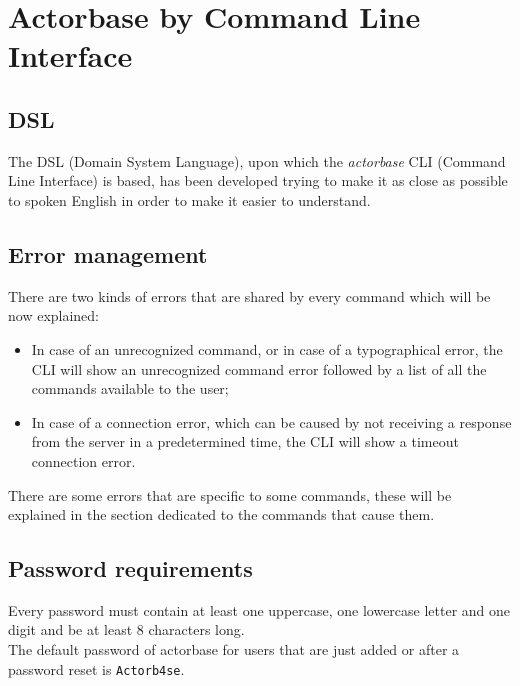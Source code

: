 \documentclass{scalatekids-article}
\begin{document}
\section{Actorbase by Command Line Interface}

\subsection{DSL}

The DSL (Domain System Language), upon which the \textit{actorbase} CLI (Command
Line Interface) is based, has been developed trying to make it as close as possible
to spoken English in order to make it easier to understand.

\subsection{Error management}

There are two kinds of errors that are shared by every command which will be
now explained:
\begin{itemize}
\item In case of an unrecognized command, or in case of a typographical error,
  the CLI will show an unrecognized command error followed by a list of all
  the commands available to the user;
\item In case of a connection error, which can be caused by not receiving a
  response from the server in a predetermined time, the CLI will show a
  timeout connection error.
\end{itemize}
There are some errors that are specific to some commands, these will be explained
in the section dedicated to the commands that cause them.


\subsection{Password requirements}
\label{sec:passwordrequirement}
Every password must contain at least one uppercase, one lowercase letter and one
digit and be at least 8 characters long.\\
The default password of actorbase for users that are just added or after a password reset is \texttt{Actorb4se}.
\end{document}

